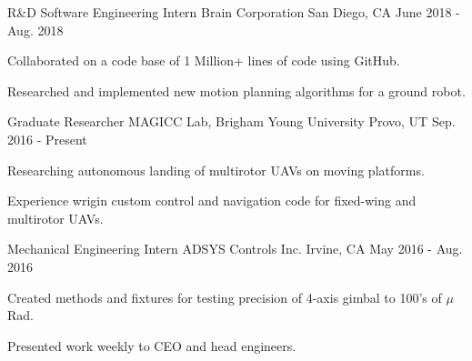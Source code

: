 

\begin{cventries}

  \cventry
    {R\&D Software Engineering Intern} %
    {Brain Corporation} %
    {San Diego, CA} %
    {June 2018 - Aug. 2018} %
    {
      \begin{cvitems} %
        \item {Collaborated on a code base of 1 Million+ lines of code using
          GitHub.}
        \item {Researched and implemented new motion planning algorithms for a
          ground robot.}
      \end{cvitems}
    }

  \cventry
    {Graduate Researcher} %
    {MAGICC Lab, Brigham Young University} %
    {Provo, UT} %
    {Sep. 2016 - Present} %
    {
      \begin{cvitems} %
        \item {Researching autonomous landing of multirotor UAVs on moving
          platforms.}
        \item {Experience wrigin custom control and navigation code for
          fixed-wing and multirotor UAVs.}
      \end{cvitems}
    }

  \cventry
    {Mechanical Engineering Intern} %
    {ADSYS Controls Inc.} %
    {Irvine, CA} %
    {May 2016 - Aug. 2016} %
    {
      \begin{cvitems} %
        \item {Created methods and fixtures for testing precision of 4-axis gimbal
          to 100's of $\mu$Rad.}
        \item {Presented work weekly to CEO and head engineers.}
      \end{cvitems}
    }


\end{cventries}
